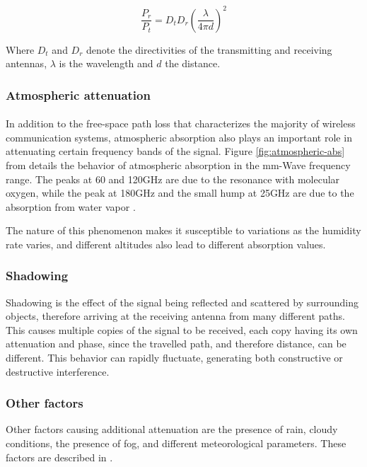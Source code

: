 \begin{equation}
    \frac{P_r}{P_t} = D_tD_r\left(\frac{\lambda}{4\pi d}\right)^2
    \label{eqn:fspl}
\end{equation}

Where $D_t$ and $D_r$ denote the directivities of the transmitting and receiving antennas, $\lambda$ is the wavelength and $d$ the distance.


\subsubsection{Atmospheric attenuation}
\paragraph{}
In addition to the free-space path loss that characterizes the majority of wireless communication systems, atmospheric absorption also plays an important role in attenuating certain frequency bands of the signal. Figure \ref{fig:atmospheric-abs} from \cite{e-band-ammar} details the behavior of atmospheric absorption in the mm-Wave frequency range. The peaks at 60 and 120GHz are due to the resonance with molecular oxygen, while the peak at 180GHz and the small hump at 25GHz are due to the absorption from water vapor \cite{e-band-ammar}.

The nature of this phenomenon makes it susceptible to variations as the humidity rate varies, and different altitudes also lead to different absorption values.

\subsubsection{Shadowing}
Shadowing is the effect of the signal being reflected and scattered by surrounding objects, therefore arriving at the receiving antenna from many different paths. This causes multiple copies of the signal to be received, each copy having its own attenuation and phase, since the travelled path, and therefore distance, can be different. This behavior can rapidly fluctuate, generating both constructive or destructive interference.

\subsubsection{Other factors}
Other factors causing additional attenuation are the presence of rain, cloudy conditions, the presence of fog, and different meteorological parameters. These factors are described in \cite{atm-effects-signal-prop}.

